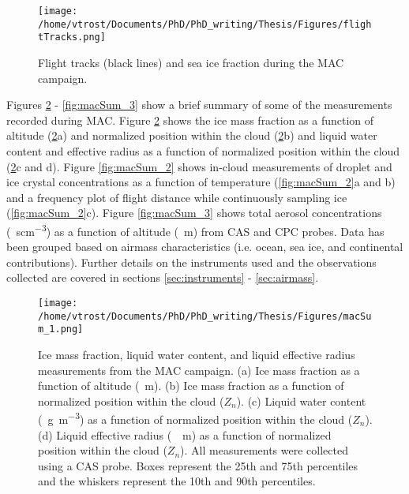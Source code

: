 \begin{figure}[H]
	\centering
	\texttt{[image: /home/vtrost/Documents/PhD/PhD\_writing/Thesis/Figures/flightTracks.png]}
	\caption{Flight tracks (black lines) and sea ice fraction during the MAC campaign. \citep[][Figure 1b]{oshea2017}}
	\label{fig:flightTracks}
\end{figure}

Figures \ref{fig:macSum_1} - \ref{fig:macSum_3} show a brief summary of some of the measurements recorded during MAC. Figure \ref{fig:macSum_1} shows the ice mass fraction as a function of altitude (\ref{fig:macSum_1}a) and normalized position within the cloud (\ref{fig:macSum_1}b) and liquid water content and effective radius as a function of normalized position within the cloud (\ref{fig:macSum_1}c and d). Figure \ref{fig:macSum_2} shows in-cloud measurements of droplet and ice crystal concentrations as a function of temperature (\ref{fig:macSum_2}a and b) and a frequency plot of flight distance while continuously sampling ice (\ref{fig:macSum_2}c). Figure \ref{fig:macSum_3} shows total aerosol concentrations (\SI{}{scm^{-3}}) as a function of altitude (\SI{}{m}) from CAS and CPC probes. Data has been grouped based on airmass characteristics (i.e. ocean, sea ice, and continental contributions). Further details on the instruments used and the observations collected are covered in sections \ref{sec:instruments} - \ref{sec:airmass}.

\begin{figure}[H]
	\centering
	\texttt{[image: /home/vtrost/Documents/PhD/PhD\_writing/Thesis/Figures/macSum\_1.png]}
	\caption{Ice mass fraction, liquid water content, and liquid effective radius measurements from the MAC campaign. (a) Ice mass fraction as a function of altitude (\SI{}{m}). (b) Ice mass fraction as a function of normalized position within the cloud ($Z_n$). (c) Liquid water content (\SI{}{g m^{-3}}) as a function of normalized position within the cloud ($Z_n$). (d) Liquid effective radius (\SI{}{\mu m}) as a function of normalized position within the cloud ($Z_n$). All measurements were collected using a CAS probe. Boxes represent the 25th and 75th percentiles and the whiskers represent the 10th and 90th percentiles. \citep[][Figure 3]{oshea2017}}
	\label{fig:macSum_1}
\end{figure}

